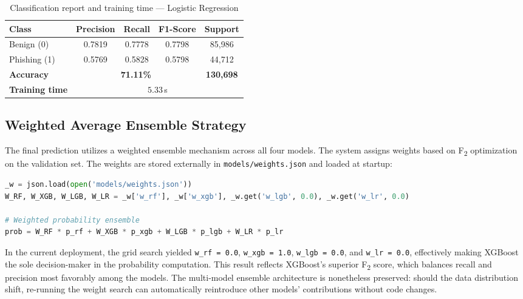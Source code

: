 \documentclass[12pt,a4paper]{article}
\begin{document}
\begin{table}[H]
    \centering
    \begin{tabular}{lcccc}
        \toprule
        \textbf{Class} & \textbf{Precision} & \textbf{Recall} & \textbf{F1-Score} & \textbf{Support} \\
        \midrule
        Benign (0)     & 0.7819 & 0.7778 & 0.7798 & 85{,}986 \\[2pt]
        Phishing (1)   & 0.5769 & 0.5828 & 0.5798 & 44{,}712 \\
        \midrule
        \textbf{Accuracy} & \multicolumn{3}{c}{\textbf{71.11\%}} & \textbf{130{,}698} \\
        \midrule
        \textbf{Training time} & \multicolumn{4}{c}{$5.33$\,s} \\
        \bottomrule
    \end{tabular}
    \caption{Classification report and training time --- Logistic Regression}
    \label{tab:lr_metrics}
\end{table}

\subsection{Weighted Average Ensemble Strategy}
The final prediction utilizes a weighted ensemble mechanism across all four models. The system assigns weights based on F\textsubscript{2} optimization on the validation set. The weights are stored externally in \texttt{models/weights.json} and loaded at startup:

\begin{lstlisting}[language=Python, caption={Loading model weights from weights.json}]
_w = json.load(open('models/weights.json'))
W_RF, W_XGB, W_LGB, W_LR = _w['w_rf'], _w['w_xgb'], _w.get('w_lgb', 0.0), _w.get('w_lr', 0.0)

# Weighted probability ensemble
prob = W_RF * p_rf + W_XGB * p_xgb + W_LGB * p_lgb + W_LR * p_lr
\end{lstlisting}

\noindent In the current deployment, the grid search yielded \texttt{w\_rf = 0.0}, \texttt{w\_xgb = 1.0}, \texttt{w\_lgb = 0.0}, and \texttt{w\_lr = 0.0}, effectively making XGBoost the sole decision-maker in the probability computation. This result reflects XGBoost's superior F\textsubscript{2} score, which balances recall and precision most favorably among the models. The multi-model ensemble architecture is nonetheless preserved: should the data distribution shift, re-running the weight search can automatically reintroduce other models' contributions without code changes.
\end{document}
